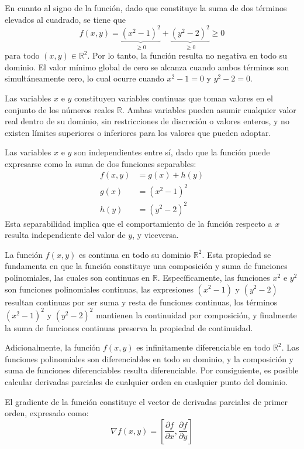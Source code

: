 \documentclass[12pt,a4paper]{article}
\begin{document}
En cuanto al signo de la función, dado que constituye la suma de dos términos elevados al cuadrado, se tiene que
\[f(x,y) = \underbrace{(x^2 - 1)^2}_{\geq 0} + \underbrace{(y^2 - 2)^2}_{\geq 0} \geq 0\]
para todo $(x,y) \in \mathbb{R}^2$. Por lo tanto, la función resulta no negativa en todo su dominio. El valor mínimo global de cero se alcanza cuando ambos términos son simultáneamente cero, lo cual ocurre cuando $x^2 - 1 = 0$ y $y^2 - 2 = 0$.

Las variables $x$ e $y$ constituyen variables continuas que toman valores en el conjunto de los números reales $\mathbb{R}$. Ambas variables pueden asumir cualquier valor real dentro de su dominio, sin restricciones de discreción o valores enteros, y no existen límites superiores o inferiores para los valores que pueden adoptar.

Las variables $x$ e $y$ son independientes entre sí, dado que la función puede expresarse como la suma de dos funciones separables:
\begin{align*}
f(x,y) &= g(x) + h(y) \\
g(x) &= (x^2 - 1)^2 \\
h(y) &= (y^2 - 2)^2
\end{align*}
Esta separabilidad implica que el comportamiento de la función respecto a $x$ resulta independiente del valor de $y$, y viceversa.

La función $f(x,y)$ es continua en todo su dominio $\mathbb{R}^2$. Esta propiedad se fundamenta en que la función constituye una composición y suma de funciones polinomiales, las cuales son continuas en $\mathbb{R}$. Específicamente, las funciones $x^2$ e $y^2$ son funciones polinomiales continuas, las expresiones $(x^2 - 1)$ y $(y^2 - 2)$ resultan continuas por ser suma y resta de funciones continuas, los términos $(x^2 - 1)^2$ y $(y^2 - 2)^2$ mantienen la continuidad por composición, y finalmente la suma de funciones continuas preserva la propiedad de continuidad.

Adicionalmente, la función $f(x,y)$ es infinitamente diferenciable en todo $\mathbb{R}^2$. Las funciones polinomiales son diferenciables en todo su dominio, y la composición y suma de funciones diferenciables resulta diferenciable. Por consiguiente, es posible calcular derivadas parciales de cualquier orden en cualquier punto del dominio.

El gradiente de la función constituye el vector de derivadas parciales de primer orden, expresado como:
\[\nabla f(x,y) = \left[\frac{\partial f}{\partial x}, \frac{\partial f}{\partial y}\right]\]
\end{document}
